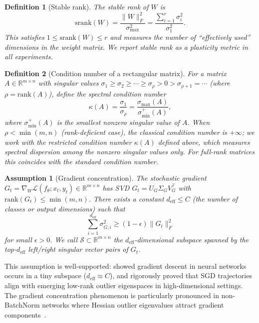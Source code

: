 \documentclass{article}
\newtheorem{definition}{Definition}
\newtheorem{assumption}{Assumption}
\newcommand{\RR}{\mathbb{R}}
\newcommand{\cL}{\mathcal{L}}
\newcommand{\cS}{\mathcal{S}}
\begin{document}
\begin{definition}[Stable rank]
\label{def:stable_rank}
The stable rank of $W$ is
\[
\mathrm{srank}(W) = \frac{\|W\|_F^2}{\sigma_{\max}^2} = \frac{\sum_{i=1}^r \sigma_i^2}{\sigma_1^2}.
\]
This satisfies $1 \leq \mathrm{srank}(W) \leq r$ and measures the number of ``effectively used'' dimensions in the weight matrix. We report stable rank as a plasticity metric in all experiments.
\end{definition}

\begin{definition}[Condition number of a rectangular matrix]
\label{def:kappa_rect}
For a matrix $A \in \RR^{m \times n}$ with singular values $\sigma_1 \geq \sigma_2 \geq \cdots \geq \sigma_{\rho} > 0 > \sigma_{\rho+1} = \cdots$ (where $\rho = \mathrm{rank}(A)$), define the \emph{spectral condition number}
\[
\kappa(A) = \frac{\sigma_1}{\sigma_\rho} = \frac{\sigma_{\max}(A)}{\sigma_{\min}^+(A)},
\]
where $\sigma_{\min}^+(A)$ is the smallest \emph{nonzero} singular value of $A$. When $\rho < \min(m,n)$ (rank-deficient case), the classical condition number is $+\infty$; we work with the restricted condition number $\kappa(A)$ defined above, which measures spectral dispersion among the nonzero singular values only. For full-rank matrices this coincides with the standard condition number.
\end{definition}

\begin{assumption}[Gradient concentration]
\label{ass:grad_conc}
The stochastic gradient $G_t = \nabla_W \cL(f_\theta; x_t, y_t) \in \RR^{m\times n}$ has SVD $G_t = U_G \Sigma_G V_G^\top$ with $\mathrm{rank}(G_t) \leq \min(m,n)$. There exists a constant $d_{\mathrm{eff}} \leq C$ (the number of classes or output dimensions) such that
\[
\sum_{i=1}^{d_\mathrm{eff}} \sigma_{G,i}^2 \geq (1-\epsilon) \|G_t\|_F^2
\]
for small $\epsilon > 0$. We call $\cS \subset \RR^{m \times n}$ the $d_{\mathrm{eff}}$-dimensional subspace spanned by the top-$d_{\mathrm{eff}}$ left/right singular vector pairs of $G_t$.
\end{assumption}

This assumption is well-supported: \citet{gurari2018gradient} showed gradient descent in neural networks occurs in a tiny subspace ($d_\mathrm{eff} \approx C$), and \citet{ben2022high} rigorously proved that SGD trajectories align with emerging low-rank outlier eigenspaces in high-dimensional settings. The gradient concentration phenomenon is particularly pronounced in non-BatchNorm networks where Hessian outlier eigenvalues attract gradient components~\citep{ghorbani2019investigation}.
\end{document}
